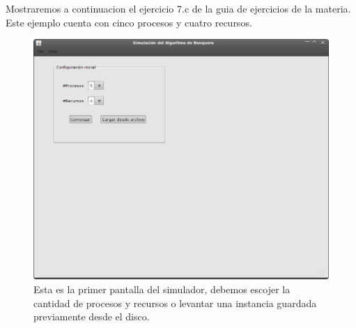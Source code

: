 Mostraremos a continuacion el ejercicio 7.c de la guia de ejercicios de la materia. Este ejemplo cuenta con cinco procesos y cuatro recursos.
\begin{figure}
\centering
 \includegraphics[scale=0.4,keepaspectratio=true]{./imagenes/banquero/banquero1.png}
 \caption{Esta es la primer pantalla del simulador, debemos escojer la cantidad de procesos y recursos o levantar una instancia guardada previamente desde el disco.}
\end{figure}
